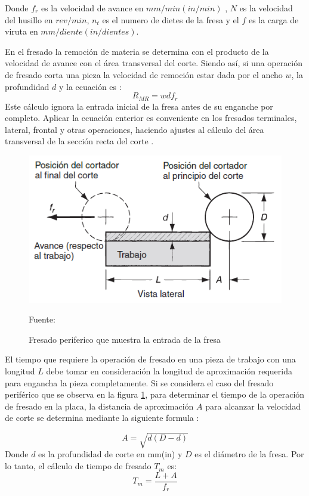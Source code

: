 Donde $f_{r}$ es la velocidad de avance en $mm/min (in/min)$ , $N$ es la velocidad del husillo en $rev/min$, $n_{t}$  es el numero de dietes de la fresa y el $f$ es la carga de viruta en $mm/diente(in/dientes)$. 

En el fresado la remoción de materia se determina con el producto de la velocidad de avance con el área transversal del corte. Siendo así, si una operación de fresado corta una pieza la velocidad de remoción estar dada por el ancho $w$, la profundidad $d$ y la ecuación es \citep{groover2007fundamentals}:
\begin{equation}
    R_{MR}=w d f_{r}
\end{equation}
Este cálculo ignora la entrada inicial de la fresa antes de su enganche por completo. Aplicar la ecuación enterior es conveniente en los fresados terminales, lateral, frontal y otras operaciones, haciendo ajustes al cálculo del área transversal de la sección recta del corte \citep{groover2007fundamentals}.

\begin{figure}[hbt]
        \centering
        \includegraphics[width=0.6\linewidth]{Cap1_FormulaciondelProyecto/Figuras/fresadaPentrada.PNG}
    \caption{Fresado periferico que muestra la entrada de la fresa}{Fuente: \citep{groover2007fundamentals}}
    \label{fig:fresadaPentrada}
\end{figure}

El tiempo que requiere la operación de fresado en una pieza de trabajo con una longitud $L$ debe tomar en consideración la longitud de aproximación requerida para engancha la pieza completamente. Si se considera el caso del fresado periférico que se observa en la figura \ref{fig:fresadaPentrada}, para determinar el tiempo de la operación de fresado en la placa, la distancia de aproximación $A$ para alcanzar la velocidad de corte se determina mediante la siguiente formula \citep{groover2007fundamentals}:

\begin{equation}
    A=\sqrt{d(D-d)}
\end{equation}
Donde $d$ es la profundidad de corte en mm(in) y $D$ es el diámetro de la fresa. Por lo tanto, el cálculo de tiempo de fresado $T_{m}$ es:
\begin{equation}
    T_{m}=\frac{L+A}{f_{r}}
\end{equation}

